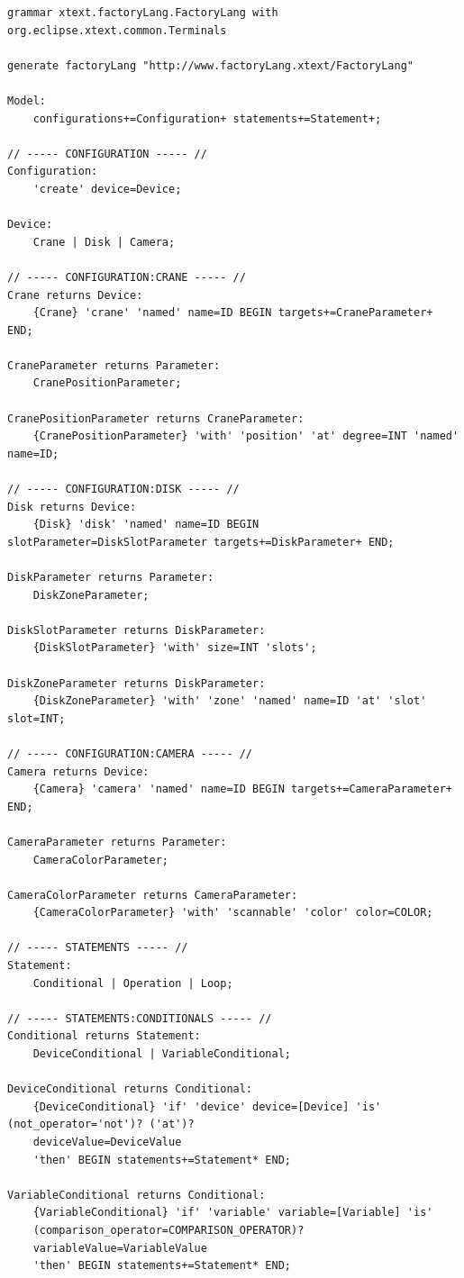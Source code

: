 \begin{verbatim}
grammar xtext.factoryLang.FactoryLang with org.eclipse.xtext.common.Terminals

generate factoryLang "http://www.factoryLang.xtext/FactoryLang"

Model:
	configurations+=Configuration+ statements+=Statement+;

// ----- CONFIGURATION ----- //
Configuration:
	'create' device=Device;

Device:
	Crane | Disk | Camera;

// ----- CONFIGURATION:CRANE ----- //
Crane returns Device:
	{Crane} 'crane' 'named' name=ID BEGIN targets+=CraneParameter+ END;

CraneParameter returns Parameter:
	CranePositionParameter;

CranePositionParameter returns CraneParameter:
	{CranePositionParameter} 'with' 'position' 'at' degree=INT 'named' name=ID;

// ----- CONFIGURATION:DISK ----- //
Disk returns Device:
	{Disk} 'disk' 'named' name=ID BEGIN slotParameter=DiskSlotParameter targets+=DiskParameter+ END;

DiskParameter returns Parameter:
	DiskZoneParameter;

DiskSlotParameter returns DiskParameter:
	{DiskSlotParameter} 'with' size=INT 'slots';

DiskZoneParameter returns DiskParameter:
	{DiskZoneParameter} 'with' 'zone' 'named' name=ID 'at' 'slot' slot=INT;

// ----- CONFIGURATION:CAMERA ----- //
Camera returns Device:
	{Camera} 'camera' 'named' name=ID BEGIN targets+=CameraParameter+ END;

CameraParameter returns Parameter:
	CameraColorParameter;

CameraColorParameter returns CameraParameter:
	{CameraColorParameter} 'with' 'scannable' 'color' color=COLOR;

// ----- STATEMENTS ----- //
Statement:
	Conditional | Operation | Loop;

// ----- STATEMENTS:CONDITIONALS ----- //
Conditional returns Statement:
	DeviceConditional | VariableConditional;

DeviceConditional returns Conditional:
	{DeviceConditional} 'if' 'device' device=[Device] 'is' (not_operator='not')? ('at')?
	deviceValue=DeviceValue
	'then' BEGIN statements+=Statement* END;

VariableConditional returns Conditional:
	{VariableConditional} 'if' 'variable' variable=[Variable] 'is'
	(comparison_operator=COMPARISON_OPERATOR)?
	variableValue=VariableValue
	'then' BEGIN statements+=Statement* END;


\end{verbatim}
